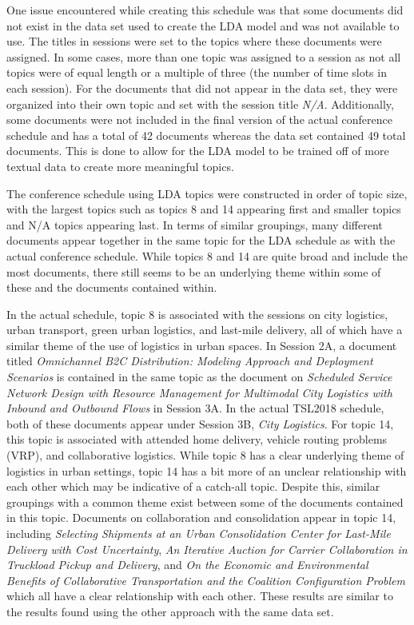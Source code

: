 \documentclass[a4paper, 12pt, twoside]{article}
\numberwithin{equation}{section} %
\begin{document}
One issue encountered while creating this schedule was that some documents did not exist in the data set used to create the LDA model and was not available to use. The titles in sessions were set to the topics where these documents were assigned. In some cases, more than one topic was assigned to a session as not all topics were of equal length or a multiple of three (the number of time slots in each session). For the documents that did not appear in the data set, they were organized into their own topic and set with the session title \textit{N/A}. Additionally, some documents were not included in the final version of the actual conference schedule and has a total of 42 documents whereas the data set contained 49 total documents. This is done to allow for the LDA model to be trained off of more textual data to create more meaningful topics. 

The conference schedule using LDA topics were constructed in order of topic size, with the largest topics such as topics 8 and 14 appearing first and smaller topics and N/A topics appearing last. In terms of similar groupings, many different documents appear together in the same topic for the LDA schedule as with the actual conference schedule. While topics 8 and 14 are quite broad and include the most documents, there still seems to be an underlying theme within some of these and the documents contained within.

In the actual schedule, topic 8 is associated with the sessions on city logistics, urban transport, green urban logistics, and last-mile delivery, all of which have a similar theme of the use of logistics in urban spaces. In Session 2A, a document titled \textit{Omnichannel B2C Distribution: Modeling Approach and Deployment Scenarios} is contained in the same topic as the document on \textit{Scheduled Service Network Design with Resource Management for Multimodal City Logistics with Inbound and Outbound Flows} in Session 3A. In the actual TSL2018 schedule, both of these documents appear under Session 3B, \textit{City Logistics}.  For topic 14, this topic is associated with attended home delivery, vehicle routing problems (VRP), and collaborative logistics. While topic 8 has a clear underlying theme of logistics in urban settings, topic 14 has a bit more of an unclear relationship with each other which may be indicative of a catch-all topic. Despite this, similar groupings with a common theme exist between some of the documents contained in this topic. Documents on collaboration and consolidation appear in topic 14, including \textit{Selecting Shipments at an Urban Consolidation Center for Last-Mile Delivery with Cost Uncertainty}, \textit{An Iterative Auction for Carrier Collaboration in Truckload Pickup and Delivery}, and \textit{On the Economic and Environmental Benefits of Collaborative Transportation and the Coalition Configuration Problem} which all have a clear relationship with each other. These results are similar to the results found using the other approach with the same data set.
\end{document}
